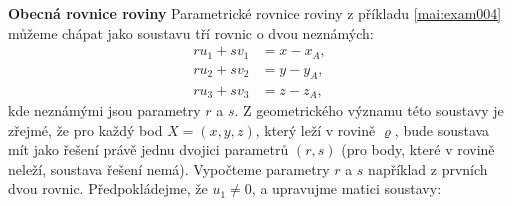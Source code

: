 \begin{mdframed}[style=mdexam]
  \begin{example}\label{mai:exam040}
    \textbf{Obecná rovnice roviny}\newline
    Parametrické rovnice roviny z příkladu \ref{mai:exam004} můžeme chápat jako soustavu tří rovnic
    o dvou neznámých:
    \begin{align*}
        ru_1 + sv_1 &= x - x_A, \\
        ru_2 + sv_2 &= y - y_A, \\
        ru_3 + sv_3 &= z - z_A, 
    \end{align*}
    kde neznámými jsou parametry \(r\) a \(s\). Z geometrického významu této soustavy je zřejmé, že
    pro každý bod \(X = (x, y, z)\), který leží v rovině \(\varrho\), bude soustava mít jako řešení
    právě jednu dvojici parametrů \((r, s)\) (pro body, které v rovině neleží, soustava řešení
    nemá). Vypočteme parametry \(r\) a \(s\) například z prvních dvou rovnic. Předpokládejme, že
    \(u_1 \neq 0\), a upravujme matici soustavy:
    

\end{example}
\end{mdframed}
